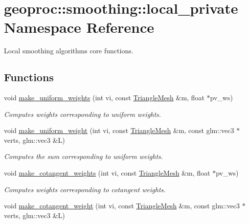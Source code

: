 \hypertarget{namespacegeoproc_1_1smoothing_1_1local__private}{}\section{geoproc\+:\+:smoothing\+:\+:local\+\_\+private Namespace Reference}
\label{namespacegeoproc_1_1smoothing_1_1local__private}


Local smoothing algorithms core functions.  


\subsection*{Functions}
\begin{DoxyCompactItemize}
\item 
void \hyperlink{namespacegeoproc_1_1smoothing_1_1local__private_afa8f6895e6f658b6ec77da138347971f}{make\+\_\+uniform\+\_\+weights} (int vi, const \hyperlink{classgeoproc_1_1TriangleMesh}{Triangle\+Mesh} \&m, float $\ast$pv\+\_\+ws)
\begin{DoxyCompactList}\small\item\em Computes weights corresponding to uniform weights. \end{DoxyCompactList}\item 
void \hyperlink{namespacegeoproc_1_1smoothing_1_1local__private_a6f1acdf579d13e299b947a6619571df7}{make\+\_\+uniform\+\_\+weight} (int vi, const \hyperlink{classgeoproc_1_1TriangleMesh}{Triangle\+Mesh} \&m, const glm\+::vec3 $\ast$verts, glm\+::vec3 \&L)
\begin{DoxyCompactList}\small\item\em Computes the sum corresponding to uniform weights. \end{DoxyCompactList}\item 
void \hyperlink{namespacegeoproc_1_1smoothing_1_1local__private_a5ef9cdfdd013ff5b017f98ba9b94d280}{make\+\_\+cotangent\+\_\+weights} (int vi, const \hyperlink{classgeoproc_1_1TriangleMesh}{Triangle\+Mesh} \&m, float $\ast$pv\+\_\+ws)
\begin{DoxyCompactList}\small\item\em Computes weights corresponding to cotangent weights. \end{DoxyCompactList}\item 
void \hyperlink{namespacegeoproc_1_1smoothing_1_1local__private_ae75c9986480b1c0cd2c5ac84e0fe8d34}{make\+\_\+cotangent\+\_\+weight} (int vi, const \hyperlink{classgeoproc_1_1TriangleMesh}{Triangle\+Mesh} \&m, const glm\+::vec3 $\ast$verts, glm\+::vec3 \&L)

\end{DoxyCompactItemize}
